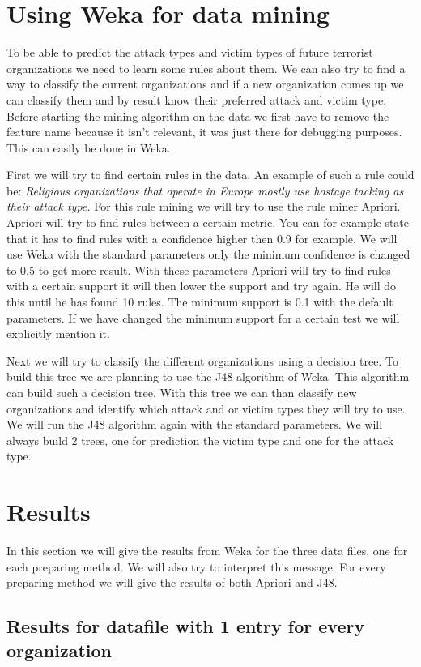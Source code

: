 \documentclass[a4]{article}
\begin{document}
\section{Using Weka for data mining}
\label{sec:weka}
To be able to predict the attack types and victim types of future terrorist organizations we need to learn some rules about them. We can also try to find a way to classify the current organizations and if a new organization comes up we can classify them and by result know their preferred attack and victim type. Before starting the mining algorithm on the data we first have to remove the feature name because it isn't relevant, it was just there for debugging purposes. This can easily be done in Weka.\par
First we will try to find certain rules in the data. An example of such a rule could be: \textit{Religious organizations that operate in Europe mostly use hostage tacking as their attack type.} For this rule mining we will try to use the rule miner Apriori. Apriori will try to find rules between a certain metric. You can for example state that it has to find rules with a confidence higher then 0.9 for example. We will use Weka with the standard parameters only the minimum confidence is changed to 0.5 to get more result. With these parameters Apriori will try to find rules with a certain support it will then lower the support and try again. He will do this until he has found 10 rules. The minimum support is 0.1 with the default parameters. If we have changed the minimum support for a certain test we will explicitly mention it.\par
Next we will try to classify the different organizations using a decision tree. To build this tree we are planning to use the J48 algorithm of Weka. This algorithm can build such a decision tree. With this tree we can than classify new organizations and identify which attack and or victim types they will try to use. We will run the J48 algorithm again with the standard parameters. We will always build 2 trees, one for prediction the victim type and one for the attack type.\par
\section{Results}
\label{sec:results}
In this section we will give the results from Weka for the three data files, one for each preparing method. We will also try to interpret this message. For every preparing method we will give the results of both Apriori and J48.
\subsection{Results for datafile with 1 entry for every organization}
\end{document}
